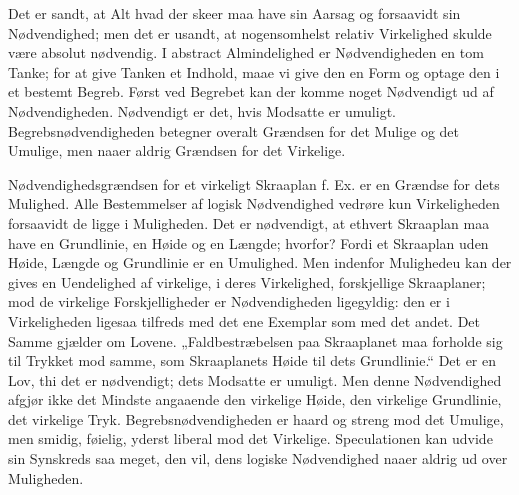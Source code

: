 \documentclass[12pt,a4paper]{book}
\begin{document}
Det er sandt, at Alt hvad der skeer maa have sin Aarsag og forsaavidt sin
Nødvendighed; men det er usandt, at nogensomhelst relativ Virkelighed
skulde være absolut nødvendig. I abstract Almindelighed er
Nødvendigheden en tom Tanke; for at give Tanken et Indhold, maae vi give
den en Form og optage den i et bestemt Begreb. Først ved Begrebet kan der
komme noget Nødvendigt ud af Nødvendigheden. Nødvendigt er det, hvis
Modsatte er umuligt. Begrebsnødvendigheden betegner overalt Grændsen for
det Mulige og det Umulige, men naaer aldrig Grændsen for det Virkelige.

Nødvendighedsgrændsen for et virkeligt Skraaplan f. Ex. er en Grændse for
dets Mulighed. Alle Bestemmelser af logisk Nødvendighed vedrøre kun
Virkeligheden forsaavidt
de ligge i Muligheden. Det er nødvendigt, at ethvert Skraaplan maa have
en Grundlinie, en Høide og en Længde; hvorfor? Fordi et Skraaplan uden
Høide, Længde og Grundlinie er en Umulighed. Men indenfor
Mulighedeu kan der gives en Uendelighed af virkelige, i deres
Virkelighed, forskjellige Skraaplaner; mod de virkelige Forskjelligheder
er Nødvendigheden ligegyldig: den er i Virkeligheden ligesaa tilfreds med
det ene Exemplar som med det andet. Det Samme gjælder om Lovene.
„Faldbestræbelsen paa Skraaplanet maa forholde sig til Trykket mod
samme, som Skraaplanets Høide til dets Grundlinie.“ Det er en Lov, thi
det er nødvendigt; dets Modsatte er umuligt. Men denne Nødvendighed
afgjør ikke det Mindste angaaende den virkelige Høide, den virkelige
Grundlinie, det virkelige Tryk. Begrebsnødvendigheden er haard og streng
mod det Umulige, men smidig, føielig, yderst liberal mod det Virkelige.
Speculationen kan udvide sin Synskreds saa meget, den vil, dens logiske
Nødvendighed naaer aldrig ud over Muligheden.
\end{document}
